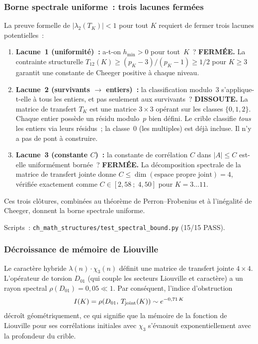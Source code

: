\documentclass[12pt,a4paper]{article}
\begin{document}
\subsubsection{Borne spectrale uniforme~: trois lacunes fermées}
\label{subsec:ch7b_three_gaps}

La preuve formelle de $|\lambda_2(T_K)| < 1$ pour tout $K$ requiert
de fermer trois lacunes potentielles~:

\begin{enumerate}[leftmargin=*]
\item \textbf{Lacune~1 (uniformité)~:} a-t-on $h_{\min} > 0$ pour
  tout~$K$~? \textbf{FERMÉE.} La contrainte structurelle
  $T_{12}(K) \geq (p_K - 3)/(p_K - 1) \geq 1/2$ pour $K \geq 3$
  garantit une constante de Cheeger positive à chaque niveau.

\item \textbf{Lacune~2 (survivants $\to$ entiers)~:} la
  classification modulo~3 s'applique-t-elle à tous les entiers, et
  pas seulement aux survivants~?
  \textbf{DISSOUTE.} La matrice de transfert $T_K$ est une matrice
  $3 \times 3$ opérant sur les classes $\{0, 1, 2\}$. Chaque entier
  possède un résidu modulo~$p$ bien défini. Le crible classifie
  \emph{tous} les entiers via leurs résidus~; la classe~$0$ (les
  multiples) est déjà incluse. Il n'y a pas de pont à construire.

\item \textbf{Lacune~3 (constante $C$)~:} la constante de corrélation
  $C$ dans $|A| \leq C$ est-elle uniformément bornée~?
  \textbf{FERMÉE.} La décomposition spectrale de la matrice de
  transfert jointe donne
  $C \leq \dim(\text{espace propre joint}) = 4$, vérifiée
  exactement comme $C \in [2{,}58~;\; 4{,}50]$ pour
  $K = 3 \ldots 11$.
\end{enumerate}

Ces trois clôtures, combinées au théorème de Perron--Frobenius et à
l'inégalité de Cheeger, donnent la borne spectrale uniforme.

Scripts~: \texttt{ch\_math\_structures/test\_spectral\_bound.py}
(15/15 PASS).

\subsubsection{Décroissance de mémoire de Liouville}
\label{subsec:ch7b_memory}

Le caractère hybride $\lambda(n) \cdot \chi_3(n)$ définit une matrice
de transfert jointe $4 \times 4$. L'opérateur de torsion $D_{01}$
(qui couple les secteurs Liouville et caractère) a un rayon spectral
$\rho(D_{01}) = 0{,}05 \ll 1$. Par conséquent, l'indice d'obstruction
\begin{equation}
  I(K) = \rho(D_{01},\, T_{\rm joint}(K)) \sim e^{-0{,}71\,K}
  \label{eq:obstruction_decay_ext}
\end{equation}
décroît géométriquement, ce qui signifie que la mémoire de la
fonction de Liouville pour ses corrélations initiales avec $\chi_3$
s'évanouit exponentiellement avec la profondeur du crible.
\end{document}
